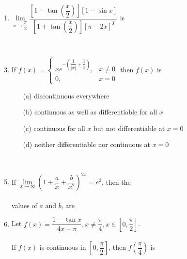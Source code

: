 \documentclass[journal,12pt,twocolumn]{IEEEtran}
\begin{document}
\begin{enumerate}
\item$\lim\limits_{x \to \dfrac{\pi}{2}}\dfrac{\left[1-\tan\left(\dfrac{x}{2}\right)\right][1-\sin x]}{\left[1+\tan\left(\dfrac{x}{2}\right)\right][\pi-2x]^3}$ is
\begin{itemize}
\end{itemize} \item[~]

\item If $f(x)=\begin{cases}
xe^{-\left(\dfrac{1}{|x|}+\dfrac{1}{x}\right)}, &\text{$x\neq 0$}\\
0, &\text{$x=0$}
\end{cases}$ then $f(x)$ is
\begin{itemize}
\item[(a)] discontinuous everywhere
\item[(b)] continuous as well as differentiable for all $x$
\item[(c)] continuous for all $x$ but not differentiable at $x=0$
\item[(d)] neither differentiable nor continuous at $x=0$
\end{itemize}\item[~]

\item If $\lim\limits_{x \to \infty}\left(1+\dfrac{a}{x}+\dfrac{b}{x^2}\right)^{2x}=e^2$, then the \\ \\values of $a$ and $b$, are
\begin{itemize}
\end{itemize}

\item Let $f(x)=\dfrac{1-\tan x}{4x-\pi}, x\neq \dfrac{\pi}{4}, x\in\left[0,\dfrac{\pi}{2}\right]$. \\ \\If $f(x)$ is continuous in $\left[0,\dfrac{\pi}{2}\right]$, then $f\left(\dfrac{\pi}{4}\right)$ is
\begin{itemize}
\end{itemize}\item[~]


\end{enumerate}
\end{document}
